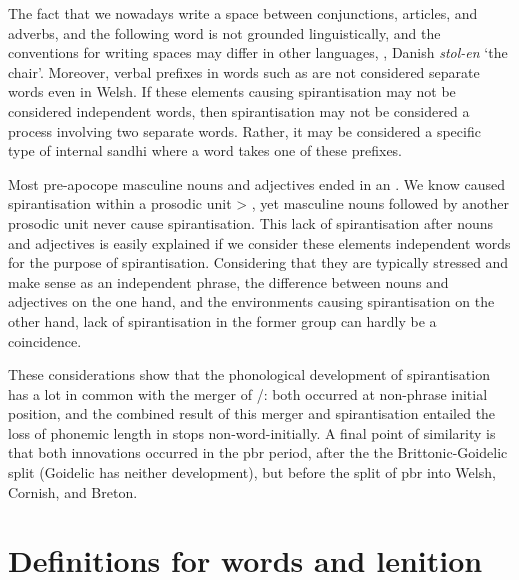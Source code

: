 The fact that we nowadays write a space between conjunctions, articles, and adverbs, \etc and the following word is not grounded linguistically, and the conventions for writing spaces may differ in other languages, \eg {}, Danish \textit{stol-en} `the chair'.
Moreover, verbal prefixes in words such as  are not considered separate words even in Welsh.
If  these elements causing spirantisation may not be considered independent words, then spirantisation may not be considered a process involving two separate words.
Rather, it may be considered a specific type of internal sandhi where a word takes one of these prefixes.

Most pre-apocope masculine  nouns and adjectives ended in an .
We know  caused spirantisation within a prosodic unit \eg {} > , yet masculine nouns followed by another prosodic unit never cause spirantisation.
This lack of spirantisation after nouns and adjectives is easily explained if we consider these elements independent words for the purpose of spirantisation.
Considering that they are typically stressed and make sense as an independent phrase, the difference between nouns and adjectives on the one hand, and the environments causing spirantisation on the other hand, lack of spirantisation in the former group can hardly be a coincidence.

These considerations show that the phonological development of spirantisation has a lot in common with the merger of \xD/\lT: both occurred at non-phrase initial position, and the combined result of this merger and spirantisation entailed the loss of phonemic length in stops non-word-initially.
A final point of similarity is that both innovations occurred in the \gls{pbr} period, after the the Brittonic-Goidelic split (Goidelic has neither development), but before the split of \gls{pbr} into Welsh, Cornish, and Breton.

\section{Definitions for words and lenition}

